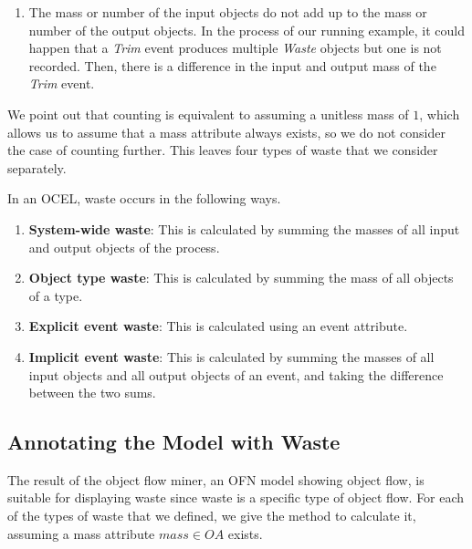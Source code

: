 \begin{enumerate}
\begin{enumerate}
        \item
        \label{item:mass-implicit}
        The mass or number of the input objects do not add up to the mass or number of the output objects.
        In the process of our running example, it could happen that a \emph{Trim} event produces multiple \emph{Waste} objects but one is not recorded.
        Then, there is a difference in the input and output mass of the \emph{Trim} event.
    \end{enumerate}
\end{enumerate}


We point out that counting is equivalent to assuming a unitless mass of $1$, which allows us to assume that a mass attribute always exists, so we do not consider the case of counting further.
This leaves four types of waste that we consider separately.


\begin{definition}
In an OCEL, waste occurs in the following ways.
\begin{enumerate}[noitemsep]
    \item 
    \textbf{System-wide waste}: This is calculated by summing the masses of all input and output objects of the process.

    \item
    \textbf{Object type waste}: This is calculated by summing the mass of all objects of a type. \\

    \item 
    \textbf{Explicit event waste}: This is calculated using an event attribute. \\

    \item
    \textbf{Implicit event waste}: This is calculated by summing the masses of all input objects and all output objects of an event, and taking the difference between the two sums. \\
\end{enumerate}
\end{definition}





\subsection{Annotating the Model with Waste}
\label{chap:annotating-the-petri-net}



The result of the object flow miner, an OFN model showing object flow, is suitable for displaying waste since waste is a specific type of object flow.
For each of the types of waste that we defined, we give the method to calculate it, assuming a mass attribute $mass \in OA$ exists.


